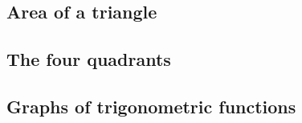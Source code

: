 \begin{outline}
\0
\subsection{Area of a triangle}

\0
\subsection{The four quadrants}

\0
\subsection{Graphs of trigonometric functions}

\end{outline}
